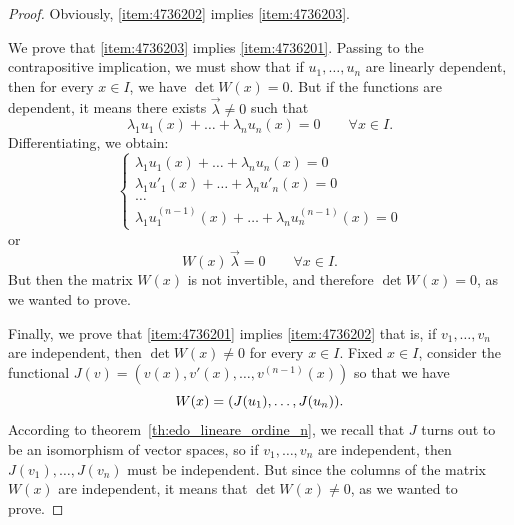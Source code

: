 \begin{proof}
Obviously, \ref{item:4736202} implies \ref{item:4736203}.

We prove that \ref{item:4736203} implies \ref{item:4736201}.
Passing to the contrapositive implication, we must show that
if $u_1,\dots, u_n$ are linearly dependent, then for every $x\in I$, we have
$\det W(x)=0$. But if the functions are dependent, it means there exists $\vec
\lambda \neq 0$ such that
\begin{equation}\label{eq:3675893}
  \lambda_1 u_1(x) + \dots + \lambda_n u_n(x) = 0 \qquad \forall x\in I.
\end{equation}
Differentiating, we obtain:
\[
\begin{cases}
  \lambda_1 u_1(x) + \dots + \lambda_n u_n(x) = 0\\
  \lambda_1 u'_1(x) + \dots + \lambda_n u'_n(x) = 0\\
  \dots\\
  \lambda_1 u^{(n-1)}_1(x) + \dots + \lambda_n u^{(n-1)}_n(x) = 0
\end{cases}
\]
or
\[
  W(x) \, \vec \lambda = 0 \qquad \forall x\in I.
\]
But then the matrix $W(x)$ is not invertible, and therefore $\det W(x)=0$, as we
wanted to prove.

Finally, we prove that \ref{item:4736201} implies \ref{item:4736202}
that is, if $v_1, \dots, v_n$ are independent, then $\det W(x) \neq 0$ for every
$x\in I$.
Fixed $x\in I$, consider the functional $J(v) = (v(x),v'(x), \dots,
v^{(n-1)}(x))$ so that we have
\[
  W(x) = {\left( J(u_1), \dots, J(u_n) \right)}.
\]
According to theorem~\ref{th:edo_lineare_ordine_n}, we recall that $J$ turns out
to be an isomorphism of vector spaces, so if $v_1,\dots,v_n$ are independent,
then $J(v_1),\dots, J(v_n)$ must be independent.
But since the columns of the matrix $W(x)$ are independent, it means that $\det
W(x)\neq 0$, as we wanted to prove.
\end{proof}

